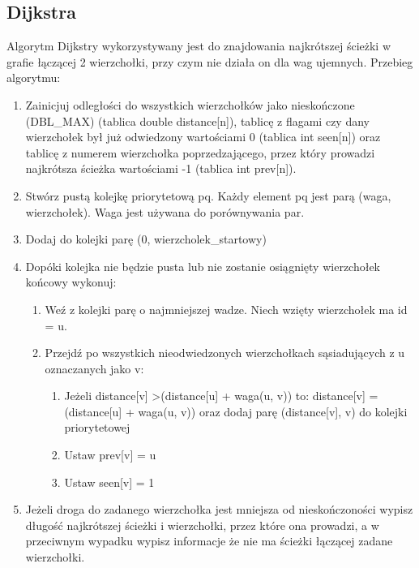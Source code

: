 \documentclass{article}
\begin{document}
\subsection{ Dijkstra } 
Algorytm Dijkstry wykorzystywany jest do znajdowania najkrótszej ścieżki w grafie łączącej 2 wierzchołki, przy czym nie działa on dla wag ujemnych. Przebieg algorytmu:
\begin{enumerate}
    \item Zainicjuj odległości do wszystkich wierzchołków jako nieskończone (DBL\_MAX) (tablica double distance[n]), tablicę z flagami czy dany wierzchołek był już odwiedzony wartościami 0 (tablica int seen[n]) oraz tablicę z numerem wierzchołka poprzedzającego, przez który prowadzi najkrótsza ścieżka  wartościami -1 (tablica int prev[n]).
    \item Stwórz pustą kolejkę priorytetową pq. Każdy element pq jest parą (waga, wierzchołek). Waga jest używana do porównywania par.
    \item Dodaj do kolejki parę (0, wierzcholek\_startowy)
    \item Dopóki kolejka nie będzie pusta lub nie zostanie osiągnięty wierzchołek końcowy wykonuj:
        \begin{enumerate}
            \item Weź z kolejki parę o najmniejszej wadze. Niech wzięty wierzchołek ma id = u.
            \item Przejdź po wszystkich nieodwiedzonych wierzchołkach sąsiadujących z u oznaczanych jako v:
            \begin{enumerate}
                \item Jeżeli distance[v] \textgreater (distance[u] + waga(u, v)) to:
                distance[v] = (distance[u] + waga(u, v)) oraz dodaj parę (distance[v], v) do kolejki priorytetowej
                \item Ustaw prev[v] = u
                \item Ustaw seen[v] = 1 
            \end{enumerate}
        \end{enumerate}
    \item Jeżeli droga do zadanego wierzchołka jest mniejsza od nieskończoności wypisz długość najkrótszej ścieżki i wierzchołki, przez które ona prowadzi, a w przeciwnym wypadku wypisz informacje że nie ma ścieżki łączącej zadane wierzchołki. 
\end{enumerate}
\end{document}
